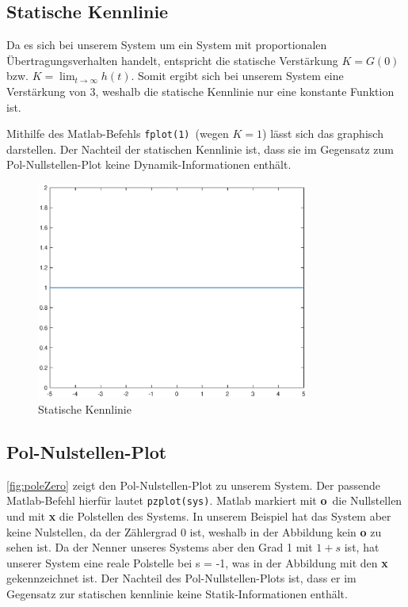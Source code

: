 \subsection{Statische Kennlinie}

Da es sich bei unserem System um ein System mit proportionalen Übertragungsverhalten 
handelt, entspricht die statische Verstärkung $K = G(0)$ bzw. $K = \lim_{t\to \infty} h(t)$. 
Somit ergibt sich bei unserem System eine Verstärkung von 3, weshalb die statische Kennlinie nur eine konstante Funktion ist. 

Mithilfe des Matlab-Befehls \texttt{fplot(1)} (wegen $K = 1$) lässt sich das graphisch darstellen. Der Nachteil der statischen Kennlinie ist, dass sie im Gegensatz zum Pol-Nullstellen-Plot keine Dynamik-Informationen enthält.


\begin{figure}[H]
    \label{fig:staticCurve}
    \centering
    \includegraphics[width=0.8\textwidth]{Bilder/StaticCurvePT1Tt.eps}
    \caption{Statische Kennlinie}
 \end{figure}

\subsection{Pol-Nulstellen-Plot}
\autoref{fig:poleZero} zeigt den Pol-Nulstellen-Plot zu unserem System. Der passende Matlab-Befehl hierfür lautet \texttt{pzplot(sys)}. Matlab markiert mit \textbf{o} die Nullstellen und mit \textbf{x} die Polstellen des Systems. In unserem Beispiel hat das System aber keine Nulstellen, da der Zählergrad 0 ist, weshalb in der Abbildung kein \textbf{o} zu sehen ist. Da der Nenner unseres Systems aber den Grad 1 mit $1 + s$ ist, hat unserer System eine reale Polstelle bei s = -1, was in der Abbildung mit den \textbf{x} gekennzeichnet ist. Der Nachteil des Pol-Nullstellen-Plots ist, dass er im Gegensatz zur statischen kennlinie keine Statik-Informationen enthält.

